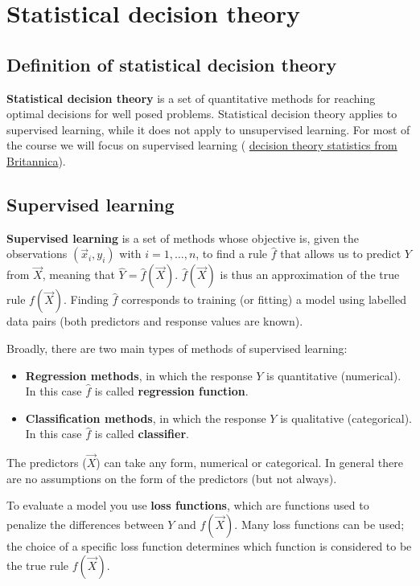 \chapter{Statistical decision theory}
  
  \section{Definition of statistical decision theory}
    \textbf{Statistical decision theory} is a set of quantitative methods for reaching optimal decisions for well posed problems. Statistical decision theory applies to supervised learning, while it does not apply to unsupervised learning. For most of the course we will focus on supervised learning ( \href{https://www.britannica.com/science/decision-theory-statistics}{decision theory statistics from Britannica}). 

  \section{Supervised learning}
    \textbf{Supervised learning} is a set of methods whose objective is, given the observations $(\vec{x}_i, y_i)$ with $i = 1, \dots, n$, to find a rule $\hat{f}$ that allows us to predict $Y$ from $\vec{X}$, meaning that $\hat{Y} = \hat{f}(\vec{X})$. $\hat{f}(\vec{X})$ is thus an approximation of the true rule $f(\vec{X})$. Finding $\hat{f}$ corresponds to training (or fitting) a model using labelled data pairs (both predictors and response values are known).

    Broadly, there are two main types of methods of supervised learning: 
    \begin{itemize}
      \item \textbf{Regression methods}, in which the response $Y$ is quantitative (numerical). In this case $\hat{f}$ is called \textbf{regression function}.
      \item \textbf{Classification methods}, in which the response $Y$ is qualitative (categorical). In this case $\hat{f}$ is called \textbf{classifier}.
    \end{itemize}
    
    The predictors ($\vec{X}$) can take any form, numerical or categorical. In general there are no assumptions on the form of the predictors (but not always).
    
    To evaluate a model you use \textbf{loss functions}, which are functions used to penalize the differences between $Y$ and $f(\vec{X})$. Many loss functions can be used; the choice of a specific loss function determines which function is considered to be the true rule $f(\vec{X})$.

